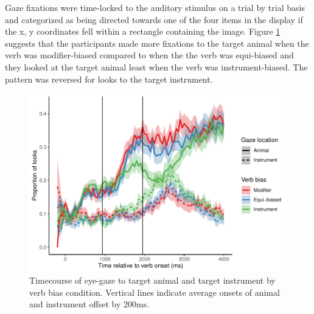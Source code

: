 \documentclass[
  man,floatsintext]{apa6}
\begin{document}
Gaze fixations were time-locked to the auditory stimulus on a trial by trial basis and categorized as being directed towards one of the four items in the display if the x, y coordinates fell within a rectangle containing the image. Figure \ref{fig:E4-gaze-timecourse-fig} suggests that the participants made more fixations to the target animal when the verb was modifier-biased compared to when the the verb was equi-biased and they looked at the target animal least when the verb was instrument-biased. The pattern was reversed for looks to the target instrument.

\begin{figure}
\centering
\includegraphics{manuscript_files/figure-latex/E4-gaze-timecourse-fig-1.pdf}
\caption{\label{fig:E4-gaze-timecourse-fig}Timecourse of eye-gaze to target animal and target instrument by verb bias condition. Vertical lines indicate average onsets of animal and instrument offset by 200ms.}
\end{figure}
\end{document}
